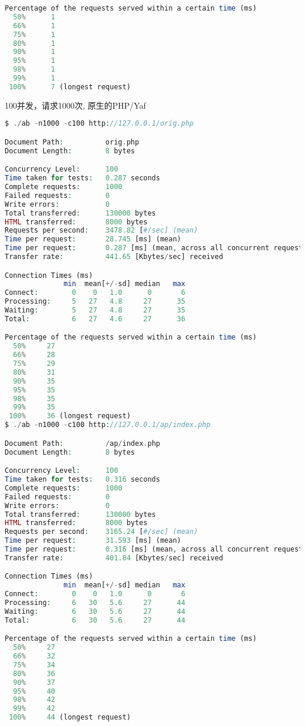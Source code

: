 \begin{compactitem}
\begin{lstlisting}[language=PHP]
Percentage of the requests served within a certain time (ms)
  50%      1
  66%      1
  75%      1
  80%      1
  90%      1
  95%      1
  98%      1
  99%      1
 100%      7 (longest request)
\end{lstlisting}

\item 100并发，请求1000次, 原生的PHP/Yaf

\begin{lstlisting}[language=PHP]
$ ./ab -n1000 -c100 http://127.0.0.1/orig.php

Document Path:          orig.php
Document Length:        8 bytes

Concurrency Level:      100
Time taken for tests:   0.287 seconds
Complete requests:      1000
Failed requests:        0
Write errors:           0
Total transferred:      130000 bytes
HTML transferred:       8000 bytes
Requests per second:    3478.82 [#/sec] (mean)
Time per request:       28.745 [ms] (mean)
Time per request:       0.287 [ms] (mean, across all concurrent requests)
Transfer rate:          441.65 [Kbytes/sec] received

Connection Times (ms)
              min  mean[+/-sd] median   max
Connect:        0    0   1.0      0       6
Processing:     5   27   4.8     27      35
Waiting:        5   27   4.8     27      35
Total:          6   27   4.6     27      36

Percentage of the requests served within a certain time (ms)
  50%     27
  66%     28
  75%     29
  80%     31
  90%     35
  95%     35
  98%     35
  99%     35
 100%     36 (longest request)
$ ./ab -n1000 -c100 http://127.0.0.1/ap/index.php

Document Path:          /ap/index.php
Document Length:        8 bytes

Concurrency Level:      100
Time taken for tests:   0.316 seconds
Complete requests:      1000
Failed requests:        0
Write errors:           0
Total transferred:      130000 bytes
HTML transferred:       8000 bytes
Requests per second:    3165.24 [#/sec] (mean)
Time per request:       31.593 [ms] (mean)
Time per request:       0.316 [ms] (mean, across all concurrent requests)
Transfer rate:          401.84 [Kbytes/sec] received

Connection Times (ms)
              min  mean[+/-sd] median   max
Connect:        0    0   1.0      0       6
Processing:     6   30   5.6     27      44
Waiting:        6   30   5.6     27      44
Total:          6   30   5.6     27      44

Percentage of the requests served within a certain time (ms)
  50%     27
  66%     32
  75%     34
  80%     36
  90%     37
  95%     40
  98%     42
  99%     42
 100%     44 (longest request)
\end{lstlisting}


\end{compactitem}

